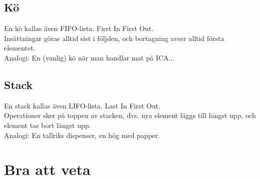 \documentclass[11pt]{article}
\begin{document}
\subsection{Kö}
En kö kallas även FIFO-lista. First In First Out. \\
Insättningar göras alltid sist i följden, och bortagning avser alltid första elementet. \\
Analogi: En (vanlig) kö när man handlar mat på ICA...

\subsection{Stack}
En stack kallas även LIFO-lista. Last In First Out. \\
Operationer sker på toppen av stacken, dvs. nya element läggs till längst upp, och element tas bort längst upp. \\
Analogi: En tallriks dispenser, en hög med papper. \\


\section{Bra att veta}
\end{document}
